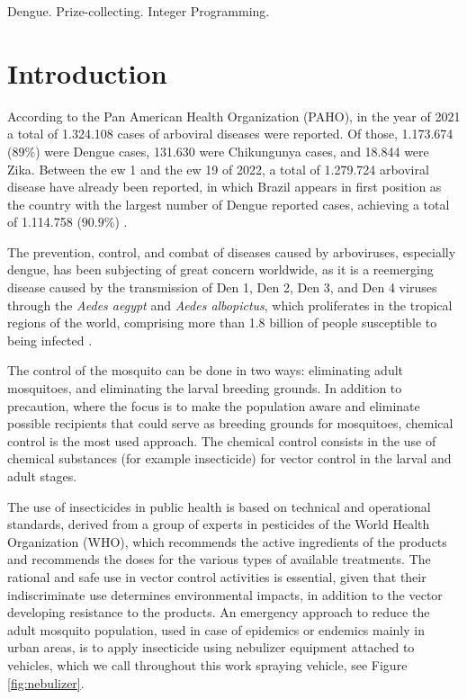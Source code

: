 \documentclass[a4paper,11pt]{article}
\begin{document}
\bigskip
\begin{keywords}
Dengue. Prize-collecting. Integer Programming.

\bigskip
\end{keywords}

 
\newpage
\section{Introduction}


According to the Pan American Health Organization  (PAHO), in the year of 2021 a
total  of  1.324.108  cases  of  arboviral diseases  were  reported.  Of  those,
1.173.674 ($89\%$) were Dengue cases, 131.630 were Chikungunya cases, and 18.844
were  Zika. Between  the \gls{ew}  1 and  the \gls{ew}  19 of  2022, a  total of
1.279.724 arboviral disease have already  been reported, in which Brazil appears
in first  position as  the country  with the largest  number of  Dengue reported
cases, achieving a total of 1.114.758 ($90.9\%$) \citep{paho-1}.

The  prevention,  control,  and  combat   of  diseases  caused  by  arboviruses,
especially dengue,  has been subjecting of  great concern worldwide, as  it is a
reemerging disease caused by the transmission of Den  1, Den 2, Den 3, and Den 4
viruses  through  the {\em  Aedes  aegypt}  and  {\em Aedes  albopictus},  which
proliferates in  the tropical  regions of  the world,  comprising more  than 1.8
billion of people susceptible to being infected \citep{negreiros-2020}.

The  control  of  the mosquito  can  be  done  in  two ways:  eliminating  adult
mosquitoes,  and  eliminating  the  larval  breeding  grounds.  In  addition  to
precaution,  where the  focus  is to  make the  population  aware and  eliminate
possible  recipients  that  could  serve as  breeding  grounds  for  mosquitoes,
chemical control is the most used approach. The chemical control consists in the
use of chemical  substances (for example insecticide) for vector  control in the
larval and adult stages.

The use of  insecticides in public health is based  on technical and operational
standards, derived  from a group  of experts in  pesticides of the  World Health
Organization (WHO), which recommends the  active ingredients of the products and
recommends the doses for the various types of available treatments. The rational
and  safe use  in  vector  control activities  is  essential,  given that  their
indiscriminate use determines  environmental impacts, in addition  to the vector
developing resistance to the products. An emergency approach to reduce the adult
mosquito  population, used  in case  of epidemics  or endemics  mainly in  urban
areas, is to  apply insecticide using nebulizer equipment  attached to vehicles,
which   we   call   throughout   this  work   spraying   vehicle,   see   Figure
\ref{fig:nebulizer}.
\end{document}
